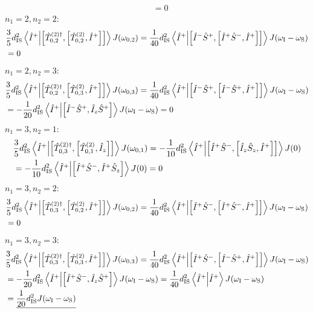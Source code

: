 \begin{appendixtext}
\begin{align*}
& = 0
\end{align*}
$n_1 = 2, n_2 = 2$:
\begin{align*}
&\frac{3}{5} d_{\text{IS}}^2 \bra{\hat{I}^+} \ket{\comm{\hat{T}_{0, 2}^{(2) \dagger}}{\comm{\hat{T}_{0,2}^{(2)}}{\hat{I}^+}}} J(\omega_{0,2}) = \frac{1}{40} d_{\text{IS}}^2 \bra{\hat{I}^+} \ket{\comm{\hat{I}^- \hat{S}^+}{\comm{\hat{I}^+ \hat{S}^-}{\hat{I}^+}}} J(\omega_{\text{I}} - \omega_{\text{S}}) \\
&= 0
\end{align*}
$n_1 = 2, n_2 = 3$:
\begin{align*}
&\frac{3}{5} d_{\text{IS}}^2 \bra{\hat{I}^+} \ket{\comm{\hat{T}_{0,2}^{(2) \dagger}}{\comm{\hat{T}_{0,3}^{(2)}}{\hat{I}^+}}} J(\omega_{0,3}) = \frac{1}{40} d_{\text{IS}}^2 \bra{\hat{I}^+} \ket{\comm{\hat{I}^- \hat{S}^+}{\comm{\hat{I}^- \hat{S}^+}{\hat{I}^+}}} J(\omega_{\text{I}} - \omega_{\text{S}}) \\
&= - \frac{1}{20} d_{\text{IS}}^2 \bra{\hat{I}^+} \ket{\comm{\hat{I}^- \hat{S}^+}{\hat{I}_z \hat{S}^+}} J(\omega_{\text{I}} - \omega_{\text{S}}) = 0
\end{align*}
$n_1 = 3, n_2 = 1$:
\begin{align*}
&\frac{3}{5} d_{\text{IS}}^2 \bra{\hat{I}^+} \ket{\comm{\hat{T}_{0,3}^{(2) \dagger}}{\comm{\hat{T}_{0,1}^{(2)}}{\hat{I}_z}}} J(\omega_{0,1}) = -\frac{1}{10} d_{\text{IS}}^2 \bra{\hat{I}^+} \ket{\comm{\hat{I}^+ \hat{S}^-}{\comm{\hat{I}_z \hat{S}_z}{\hat{I}^+}}} J(0) \\
&= -\frac{1}{10} d_{\text{IS}}^2 \bra{\hat{I}^+} \ket{\comm{\hat{I}^+ \hat{S}^-}{\hat{I}^+ \hat{S}_z}} J(0) = 0
\end{align*}
$n_1 = 3, n_2 = 2$:
\begin{align*}
&\frac{3}{5} d_{\text{IS}}^2 \bra{\hat{I}^+} \ket{\comm{\hat{T}_{0,3}^{(2) \dagger}}{\comm{\hat{T}_{0,2}^{(2)}}{\hat{I}^+}}} J(\omega_{0,2}) = \frac{1}{40} d_{\text{IS}}^2 \bra{\hat{I}^+} \ket{\comm{\hat{I}^+ \hat{S}^-}{\comm{\hat{I}^+ \hat{S}^-}{\hat{I}^+}}} J(\omega_{\text{I}} - \omega_{\text{S}}) \\
& = 0
\end{align*}
$n_1 = 3, n_2 = 3$:
\begin{align*}
&\frac{3}{5} d_{\text{IS}}^2 \bra{\hat{I}^+} \ket{\comm{\hat{T}_{0,3}^{(2) \dagger}}{\comm{\hat{T}_{0,3}^{(2)}}{\hat{I}^+}}} J(\omega_{0,3}) = \frac{1}{40} d_{\text{IS}}^2 \bra{\hat{I}^+} \ket{\comm{\hat{I}^+ \hat{S}^-}{\comm{\hat{I}^- \hat{S}^+}{\hat{I}^+}}} J(\omega_{\text{I}} - \omega_{\text{S}}) \\
&= -\frac{1}{20} d_{\text{IS}}^2 \bra{\hat{I}^+} \ket{\comm{\hat{I}^+ \hat{S}^-}{\hat{I}_z \hat{S}^+}} J(\omega_{\text{I}} - \omega_{\text{S}}) = \frac{1}{40} d_{\text{IS}}^2 \bra{\hat{I}^+} \ket{\hat{I}^+} J(\omega_{\text{I}} - \omega_{\text{S}}) \\
&= \underline{\frac{1}{20} d_{\text{IS}}^2 J(\omega_{\text{I}} - \omega_{\text{S}})}
\end{align*}

\end{appendixtext}
